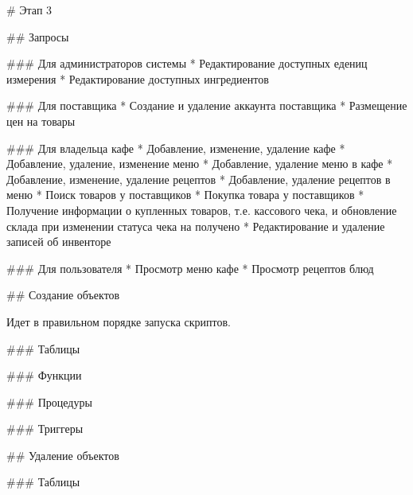 \begin{markdown}
# Этап 3

## Запросы

### Для администраторов системы
* Редактирование доступных едениц измерения
* Редактирование доступных ингредиентов

### Для поставщика
* Создание и удаление аккаунта поставщика
* Размещение цен на товары

### Для владельца кафе
* Добавление, изменение, удаление кафе 
* Добавление, удаление, изменение меню
* Добавление, удаление меню в кафе
* Добавление, изменение, удаление рецептов
* Добавление, удаление рецептов в меню
* Поиск товаров у поставщиков
* Покупка товара у поставщиков
* Получение информации о купленных товаров, т.е. кассового чека, и обновление склада при изменении статуса чека на получено
* Редактирование и удаление записей об инвенторе

### Для пользователя
* Просмотр меню кафе
* Просмотр рецептов блюд

## Создание объектов

Идет в правильном порядке запуска скриптов.

### Таблицы
\end{markdown}


\begin{markdown}
### Функции
\end{markdown}


\begin{markdown}
### Процедуры
\end{markdown}


\begin{markdown}
### Триггеры
\end{markdown}



\begin{markdown}
## Удаление объектов

### Таблицы
\end{markdown}


